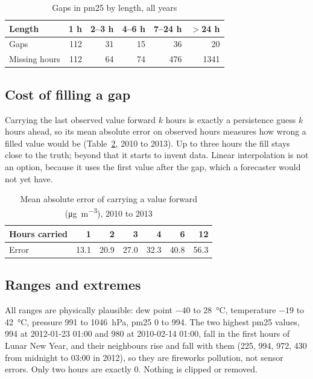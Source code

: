 \documentclass[conference]{IEEEtran}
\newcommand{\ugm}{\si{\micro\gram\per\cubic\metre}}
\begin{document}
\begin{table}[!htb]
\centering
\caption{Gaps in pm25 by length, all years}
\label{tab:gaps}
\begin{tabular}{@{}lrrrrr@{}}
\toprule
Length & 1 h & 2--3 h & 4--6 h & 7--24 h & $>$24 h \\
\midrule
Gaps & 112 & 31 & 15 & 36 & 20 \\
Missing hours & 112 & 64 & 74 & 476 & \num{1341} \\
\bottomrule
\end{tabular}
\end{table}

\subsection{Cost of filling a gap}
Carrying the last observed value forward $k$ hours is exactly a persistence guess $k$ hours ahead, so its mean absolute error on observed hours measures how wrong a filled value would be (Table~\ref{tab:fill}, 2010 to 2013). Up to three hours the fill stays close to the truth; beyond that it starts to invent data. Linear interpolation is not an option, because it uses the first value after the gap, which a forecaster would not yet have.

\begin{table}[!htb]
\centering
\caption{Mean absolute error of carrying a value forward (\ugm), 2010 to 2013}
\label{tab:fill}
\begin{tabular}{@{}lrrrrrr@{}}
\toprule
Hours carried & 1 & 2 & 3 & 4 & 6 & 12 \\
\midrule
Error & 13.1 & 20.9 & 27.0 & 32.3 & 40.8 & 56.3 \\
\bottomrule
\end{tabular}
\end{table}

\subsection{Ranges and extremes}
All ranges are physically plausible: dew point $-40$ to 28~\si{\celsius}, temperature $-19$ to 42~\si{\celsius}, pressure 991 to 1046~hPa, pm25 0 to 994. The two highest pm25 values, 994 at 2012-01-23 01:00 and 980 at 2010-02-14 01:00, fall in the first hours of Lunar New Year, and their neighbours rise and fall with them (225, 994, 972, 430 from midnight to 03:00 in 2012), so they are fireworks pollution, not sensor errors. Only two hours are exactly 0. Nothing is clipped or removed.
\end{document}
